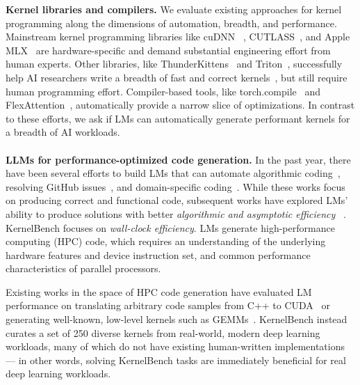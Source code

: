 \textbf{Kernel libraries and compilers.} We evaluate existing approaches for kernel programming along the dimensions of automation, breadth, and performance. Mainstream kernel programming libraries like cuDNN ~\cite{nvidiacudnn}, CUTLASS~\cite{nvidia2017cutlass}, and Apple MLX~\cite{applemlx} are hardware-specific and demand substantial engineering effort from human experts. Other libraries, like ThunderKittens~\cite{spector2023thunderkittens} and  Triton~\cite{triton}, successfully help AI researchers write a breadth of fast and correct kernels~\cite{arora2024simple, yang2024fla}, but still require human programming effort. Compiler-based tools, like torch.compile~\cite{paszke2019pytorchimperativestylehighperformance} and FlexAttention~\cite{he2024flexattention}, automatically provide a narrow slice of optimizations. In contrast to these efforts, we ask if LMs can automatically generate performant kernels for a breadth of AI workloads. 
\\\\
\noindent \textbf{LLMs for performance-optimized code generation.} In the past year, there have been several efforts to build LMs that can automate algorithmic coding~\cite{chen2021evaluatinglargelanguagemodels, shi2024languagemodelssolveolympiad, Li_2022}, resolving GitHub issues~\cite{yang2024swe,yang2024swebenchmultimodalaisystems}, and domain-specific coding~\cite{yin2022naturallanguagecodegeneration,lai2022ds1000naturalreliablebenchmark}. While these works focus on producing correct and functional code, subsequent works have explored LMs' ability to produce solutions with better \textit{algorithmic and asymptotic efficiency} ~\cite{nichols2024performancealignedllmsgeneratingfast,waghjale-etal-2024-ecco}. KernelBench focuses on \textit{wall-clock efficiency}. LMs generate high-performance computing (HPC) code, which requires an understanding of the underlying hardware features and device instruction set, and common performance characteristics of parallel processors. 

Existing works in the space of HPC code generation have evaluated LM performance on translating arbitrary code samples from C++ to CUDA~\cite{tehranijamsaz2024coderosetta,pmlr-v162-wen22b} or generating well-known, low-level kernels such as GEMMs~\cite{valerolara2023comparingllama2gpt3llms, wijk2024rebenchevaluatingfrontierai}. KernelBench instead curates a set of 250 diverse kernels from real-world, modern deep learning workloads, many of which do not have existing human-written implementations — in other words, solving KernelBench tasks are immediately beneficial for real deep learning workloads. 